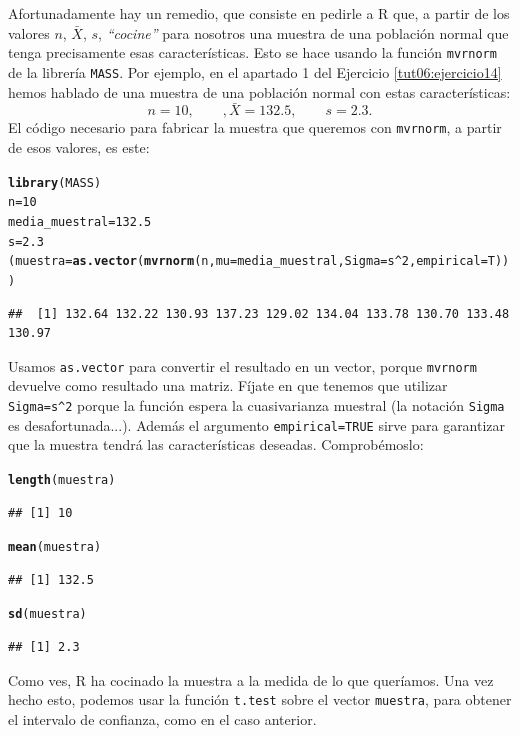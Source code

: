 \documentclass[10pt,a4paper]{article}\usepackage[]{graphicx}\usepackage[]{color}
\makeatletter
\newcommand{\hlnum}[1]{\textcolor[rgb]{0.686,0.059,0.569}{#1}}%
\newcommand{\hlopt}[1]{\textcolor[rgb]{0,0,0}{#1}}%
\newcommand{\hlstd}[1]{\textcolor[rgb]{0.345,0.345,0.345}{#1}}%
\newcommand{\hlkwb}[1]{\textcolor[rgb]{0.69,0.353,0.396}{#1}}%
\newcommand{\hlkwc}[1]{\textcolor[rgb]{0.333,0.667,0.333}{#1}}%
\newcommand{\hlkwd}[1]{\textcolor[rgb]{0.737,0.353,0.396}{\textbf{#1}}}%
\newenvironment{kframe}{%
 \def\at@end@of@kframe{}%
 \ifinner\ifhmode%
  \def\at@end@of@kframe{\end{minipage}}%
  \begin{minipage}{\columnwidth}%
 \fi\fi%
 \def\FrameCommand##1{\hskip\@totalleftmargin \hskip-\fboxsep
 \colorbox{shadecolor}{##1}\hskip-\fboxsep
     \hskip-\linewidth \hskip-\@totalleftmargin \hskip\columnwidth}%
 \MakeFramed {\advance\hsize-\width
   \@totalleftmargin\z@ \linewidth\hsize
   \@setminipage}}%
 {\par\unskip\endMakeFramed%
 \at@end@of@kframe}
\newenvironment{knitrout}{}{} %
\makeatother
\begin{document}
Afortunadamente hay un remedio, que consiste en pedirle a R que, a partir de los valores $n$, $\bar X$, $s$,  {\em ``cocine''} para nosotros una muestra de una población normal que tenga precisamente esas características. Esto se hace usando la función {\tt mvrnorm} de la librería {\tt MASS}.  Por ejemplo, en el apartado 1 del Ejercicio \ref{tut06:ejercicio14} hemos hablado de una muestra de una población normal con estas características:
\[n = 10, \qquad, \bar X = 132.5, \qquad s=2.3.\]
El código necesario para fabricar la muestra que queremos con {\tt mvrnorm}, a partir de esos valores, es este:
\begin{knitrout}
\color{fgcolor}\begin{kframe}
\begin{alltt}
\hlkwd{library}\hlstd{(MASS)}
\hlstd{n} \hlkwb{=} \hlnum{10}
\hlstd{media_muestral} \hlkwb{=} \hlnum{132.5}
\hlstd{s} \hlkwb{=} \hlnum{2.3}
\hlstd{(muestra} \hlkwb{=} \hlkwd{as.vector}\hlstd{(}\hlkwd{mvrnorm}\hlstd{(n,} \hlkwc{mu}\hlstd{=media_muestral,} \hlkwc{Sigma}\hlstd{=s}\hlopt{^}\hlnum{2}\hlstd{,} \hlkwc{empirical}\hlstd{=T)))}
\end{alltt}
\begin{verbatim}
##  [1] 132.64 132.22 130.93 137.23 129.02 134.04 133.78 130.70 133.48 130.97
\end{verbatim}
\end{kframe}
\end{knitrout}
Usamos {\tt as.vector} para convertir el resultado en un vector, porque {\tt mvrnorm} devuelve como resultado una matriz. Fíjate en que tenemos que utilizar \verb/Sigma=s^2/ porque la función espera la cuasivarianza muestral (la notación {\tt Sigma} es desafortunada...). Además el argumento {\tt empirical=TRUE} sirve para garantizar que la muestra tendrá las características deseadas. Comprobémoslo:
\begin{knitrout}
\color{fgcolor}\begin{kframe}
\begin{alltt}
\hlkwd{length}\hlstd{(muestra)}
\end{alltt}
\begin{verbatim}
## [1] 10
\end{verbatim}
\begin{alltt}
\hlkwd{mean}\hlstd{(muestra)}
\end{alltt}
\begin{verbatim}
## [1] 132.5
\end{verbatim}
\begin{alltt}
\hlkwd{sd}\hlstd{(muestra)}
\end{alltt}
\begin{verbatim}
## [1] 2.3
\end{verbatim}
\end{kframe}
\end{knitrout}
Como ves, R ha cocinado la muestra a la medida de lo que queríamos. Una vez hecho esto, podemos usar la función {\tt t.test} sobre el vector {\tt muestra}, para obtener el intervalo de confianza, como en el caso anterior.
\end{document}
